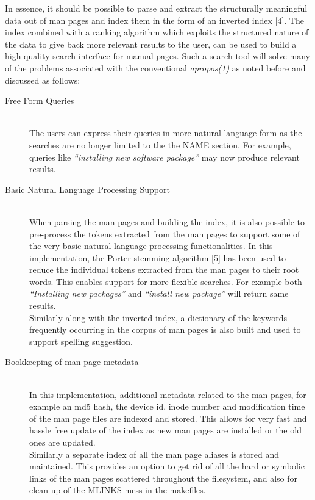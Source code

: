 \documentclass[letterpaper,twocolumn,10pt]{article}
\begin{document}
In essence, it should be possible
to parse and extract the structurally meaningful data
out of man pages and index them in the form of an inverted index [4]. The index
combined with a ranking algorithm which exploits the structured nature of the
data to give back more relevant results to the user, can be used to build a
high quality search interface for manual pages.
Such a search tool will solve many of the problems associated with the conventional \textit{apropos(1)} as noted
before and discussed as follows: \\

\begin{description}
\item[Free Form Queries] \hfill \\
The users can express their queries in more natural language form as the searches
are no longer limited to the the NAME section.
For example, queries like \textit{``installing new software package''} may
now produce relevant results.
\end{description}
\begin{description}
\item[Basic Natural Language Processing Support] \hfill \\
When parsing the man pages and building the index, it is also possible to
pre-process the tokens extracted from the man pages to support some of the very
basic natural language processing functionalities. In this implementation, the
Porter stemming algorithm [5] has been used to
reduce the individual tokens extracted from the man pages to their root words.
This enables support for more flexible searches. For example both
\textit{``Installing new packages''} and \textit{``install new package''} will
return same results. \\

Similarly along with the inverted index, a dictionary of the keywords frequently
occurring in the corpus of man pages is also built and used to support
spelling suggestion.
\end{description}
\begin{description}
\item[Bookkeeping of man page metadata] \hfill \\
In this implementation, additional metadata related to the man pages, for example
an md5 hash, the device id, inode number and modification time
of the man page files are indexed and stored.
This allows for very fast and hassle free update of the index as new man pages are installed or the old ones are updated. \\

Similarly a separate index of all the man page aliases is stored and maintained.
This provides an option to get rid of all the hard or symbolic links of the man
pages scattered throughout the filesystem, and also for clean up of the MLINKS
mess in the makefiles.
\end{description}
\end{document}
